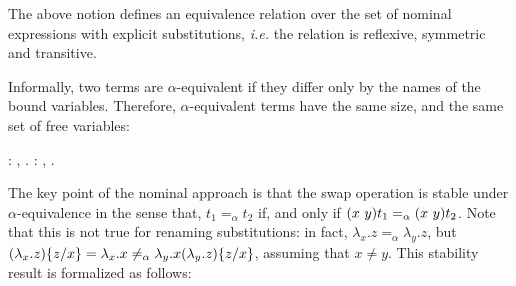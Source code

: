 The above notion defines an equivalence relation over the set  of nominal expressions with explicit substitutions, {\it i.e.} the  relation is reflexive, symmetric and transitive. 
\begin{coqdoccode}
\coqdocemptyline
\end{coqdoccode}
Informally, two terms are $\alpha$-equivalent if they differ only by the names of the bound variables. Therefore, $\alpha$-equivalent terms have the same size, and the same set of free variables: 
\begin{coqdoccode}
\coqdocemptyline
\coqdocnoindent
{} : \coqdockw{\ensuremath{\forall}}  ,         .\coqdoceol
\coqdocnoindent
{}  : \coqdockw{\ensuremath{\forall}}  ,       \coqdocnotation{[=]}  .\coqdoceol
\coqdocemptyline
\end{coqdoccode}
The key point of the nominal approach is that the swap operation is stable under $\alpha$-equivalence in the sense that, $t_1 =_\alpha t_2$ if, and only if $(x\ y) t_1 =_\alpha (x\ y) t_2$. Note that this is not true for renaming substitutions: in fact, $\lambda_x.z =_\alpha \lambda_y.z$, but $(\lambda_x.z)\{z / x\} = \lambda_x.x \neq_\alpha \lambda_y.x (\lambda_y.z)\{z / x\}$, assuming that $x \neq y$. This stability result is formalized as follows: 
